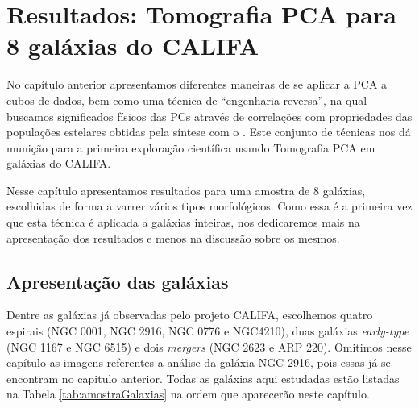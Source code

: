 


\chapter{Resultados: Tomografia PCA para 8 galáxias do CALIFA}
\label{sec:result}

No capítulo anterior apresentamos diferentes maneiras de se aplicar a PCA a cubos de dados, bem como uma técnica de
``engenharia reversa'', na qual buscamos significados físicos das PCs através de correlações com propriedades das
populações estelares obtidas pela síntese com o \starlight. Este conjunto de técnicas nos dá munição para a primeira
exploração científica usando Tomografia PCA em galáxias do CALIFA. 

Nesse capítulo apresentamos resultados para uma amostra de 8 galáxias, escolhidas de forma a varrer vários tipos
morfológicos. Como essa é a primeira vez que esta técnica é aplicada a galáxias inteiras, nos dedicaremos mais na
apresentação dos resultados e menos na discussão sobre os mesmos. 

\section{Apresentação das galáxias}
\label{sec:result:apres}

Dentre as galáxias já observadas pelo projeto CALIFA, escolhemos quatro espirais (NGC 0001, NGC 2916, NGC 0776 e
NGC4210), duas galáxias {\em early-type} (NGC 1167 e NGC 6515) e dois {\em mergers} (NGC 2623 e ARP 220). Omitimos nesse
capítulo as imagens referentes a análise da galáxia NGC 2916, pois essas já se encontram no capitulo anterior. Todas as
galáxias aqui estudadas estão listadas na Tabela \ref{tab:amostraGalaxias} na ordem que aparecerão neste capítulo.

